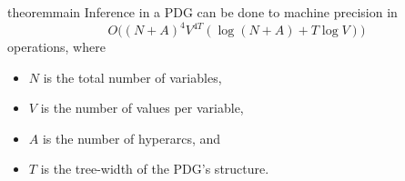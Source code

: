 \documentclass[twoside]{article}
\begin{document}

\begin{linked}{theorem}{main}
    Inference in a PDG can be done to machine precision in
    \[ O\Big(  (N\!+\!A)^4 V^{4T} (\log (N\!+\!A) + T \log V ) \Big)
    \]
    operations, where     
    \begin{itemize}[nosep,
            ]
        \item $N$ is the total number of variables,
        \item $V$ is the number of values per variable,
        \item $A$ is the number of hyperarcs, and
        \item $T$ is the tree-width of the PDG's structure.
    \end{itemize}
    
\end{linked}


\end{document}
